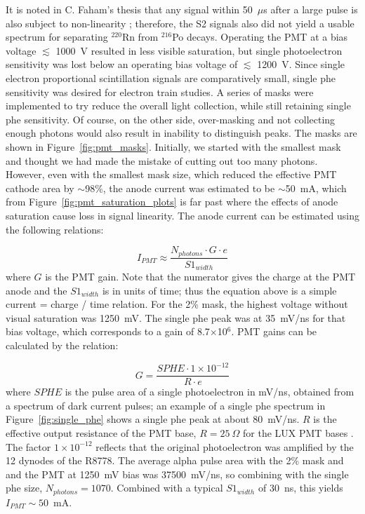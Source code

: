 It is noted in C. Faham's thesis that any signal within 50~$\mu$s after a large pulse is also subject to non-linearity \cite{Faham2014a}; therefore, the S2 signals also did not yield a usable spectrum for separating  $^{220}$Rn from $^{216}$Po decays. Operating the \ac{PMT} at a bias voltage $\lesssim$ 1000~V resulted in less visible saturation, but single photoelectron sensitivity was lost below an operating bias voltage of $\lesssim$ 1200~V. Since single electron proportional scintillation signals are comparatively small, single phe sensitivity was desired for electron train studies. A series of masks were implemented to try reduce the overall light collection, while still retaining single phe sensitivity. Of course, on the other side, over-masking and not collecting enough photons would also result in inability to distinguish peaks. The masks are shown in Figure~\ref{fig:pmt_masks}. Initially, we started with the smallest mask and thought we had made the mistake of cutting out too many photons. However, even with the smallest mask size, which reduced the effective \ac{PMT} cathode area by $\sim$98\%, the anode current was estimated to be $\sim$50~mA, which from Figure~\ref{fig:pmt_saturation_plots} is far past where the effects of anode saturation cause loss in signal linearity. The anode current can be estimated using the following relations:

\begin{equation}
I_{PMT} \approx \frac{N_{photons} \cdot G \cdot e}{S1_{width}}
\end{equation}
where $G$ is the \ac{PMT} gain. Note that the numerator gives the charge at the \ac{PMT} anode and the $S1_{width}$ is in units of time; thus the equation above is a simple current = charge / time relation. For the 2\% mask, the highest voltage without visual saturation was 1250~mV. The single phe peak was at 35~mV/ns for that bias voltage, which corresponds to a gain of 8.7$\times$10$^{6}$. \ac{PMT} gains can be calculated by the relation:

\begin{equation}
G  = \frac{SPHE \cdot 1\times 10^{-12}} { R \cdot  e}
\end{equation}
where $SPHE$ is the pulse area of a single photoelectron in mV/ns, obtained from a spectrum of dark current pulses; an example of a single phe spectrum in Figure~\ref{fig:single_phe} shows a single phe peak at about 80~mV/ns.  $R$ is the effective output resistance of the \ac{PMT} base,  $R=25~\Omega$ for the \ac{LUX} \ac{PMT} bases \cite{Faham2014a}. The factor $1\times 10^{-12}$ reflects that the original photoelectron was amplified by the 12 dynodes of the R8778. The average alpha pulse area with the 2\% mask and and the \ac{PMT} at 1250~mV bias was 37500~mV/ns, so combining with the single phe size, $N_{photons} = 1070$. Combined with a typical $S1_{width}$ of 30~ns, this yields $I_{PMT} \sim50$~mA.

